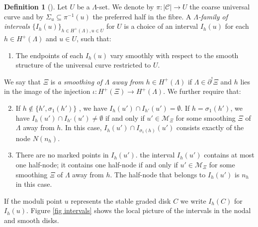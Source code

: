 \documentclass[11pt]{amsart}
\theoremstyle{definition}
\newtheorem{definition}[dummy]{Definition}
\theoremstyle{remark}
\newcommand{\<}{\left<}
\renewcommand{\>}{\right>}
\numberwithin{equation}{section}
\begin{document}
\begin{definition}[{\cite[Definition 3.4]{BCT2}}]
Let $U$ be a $\Lambda$-set. We denote by $\pi:\lvert\mathcal C\rvert\to U$ the coarse universal curve and by $\Sigma_u \subseteq \pi^{-1}(u)$ the preferred half in the fibre. A \textit{$\Lambda$-family of intervals} $\{I_{h}(u)\}_{h\in{H^+}(\Lambda),u\in U}$ for $U$ is a choice of an interval $I_{h}(u)$ for each $h\in{H^+}(\Lambda)$ and $u\in U$, %
such that:
\begin{enumerate}
\item
The endpoints %
of each $I_h(u)$ vary smoothly with respect to the smooth structure of the universal curve restricted to $U$.
\end{enumerate}
We say that $\Xi$ is \textit{a smoothing of $\Lambda$ away from $h\in H^+(\Lambda)$} if $\Lambda\in\partial^!\Xi$ and $h$ lies in the image of the injection $\iota:H^+(\Xi)\to H^+(\Lambda)$. We further %
require that:
\begin{enumerate}
\setcounter{enumi}{1}
\item
If $h \notin\{ h', \sigma_1(h')\}$%
, we have $I_h(u')\cap I_{h'}(u')=\emptyset$.  If $h=\sigma_1(h')$, we have $I_h(u')\cap I_{h'}(u')\neq\emptyset$ if and only if $u'\in{\mathcal M}_\Xi$ for some smoothing $\Xi$ of $\Lambda$ away from $h$.
  In this case, $I_h(u')\cap I_{\sigma_1(h)}(u')$ consists exactly of the %
node $N(n_{h})$.
\item There are %
no marked points in $I_h(u')$. the interval $I_h(u')$ contains at most one half-node; it contains one half-node if and only if $u'\in{\mathcal M}_\Xi$ for some smoothing $\Xi$ of $\Lambda$ away from $h$. The half-node that belongs to $I_h(u')$ is $n_{h}$ in this case.
\end{enumerate}

If the moduli point $u$ represents the stable graded %
disk $C$ we %
write $I_h(C)$ for $I_h(u).$ Figure \ref{fig intervals} shows the local picture of the intervals in the nodal and smooth disks.
\end{definition}
\end{document}
